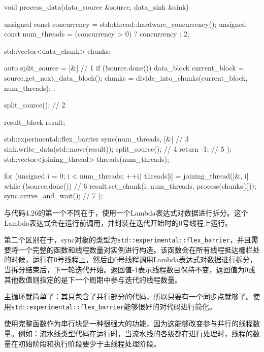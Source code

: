 \begin{cpp}
void process_data(data_source &source, data_sink &sink) {
  unsigned const concurrency = std::thread::hardware_concurrency();
  unsigned const num_threads = (concurrency > 0) ? concurrency : 2;

  std::vector<data_chunk> chunks;

  auto split_source = [&] { // 1
    if (!source.done()) {
      data_block current_block = source.get_next_data_block();
      chunks = divide_into_chunks(current_block, num_threads);
    }
  };

  split_source(); // 2

  result_block result;

  std::experimental::flex_barrier sync(num_threads, [&] { // 3
    sink.write_data(std::move(result));
    split_source(); // 4
    return -1; // 5
  });
  std::vector<joining_thread> threads(num_threads);

  for (unsigned i = 0; i < num_threads; ++i) {
    threads[i] = joining_thread([&, i] {
      while (!source.done()) { // 6
        result.set_chunk(i, num_threads, process(chunks[i]));
        sync.arrive_and_wait(); // 7
      }
    });
  }
}
\end{cpp}

与代码4.26的第一个不同在于，使用一个Lambda表达式对数据进行拆分。这个Lambda表达式会在运行前调用，并封装在迭代开始时的0号线程上运行。

第二个区别在于，sync对象的类型为\texttt{std::experimental::flex\_barrier}，并且需要将一个完整的函数和线程数量对实例进行构造。该函数会在所有线程抵达栅栏处的时候，运行在0号线程上，然后由0号线程调用Lambda表达式对数据进行拆分，当拆分结束后，下一轮迭代开始。返回值-1表示线程数目保持不变，返回值为0或其他数值则指定的是下一个周期中参与迭代的线程数量。

主循环就简单了：其只包含了并行部分的代码，所以只要有一个同步点就够了。使用\texttt{std::experimental::flex\_barrier}能够很好的对代码进行简化。

使用完整函数作为串行块是一种很强大的功能，因为这能够改变参与并行的线程数量。例如：流水线类型代码在运行时，当流水线的各级都在进行处理时，线程的数量在初始阶段和执行阶段要少于主线程处理阶段。



